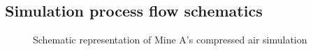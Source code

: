 \begin{appendices}
	\renewcommand{\thechapter}{\Roman{chapter}}	

\chapter{\hspace{0.3cm}Simulation process flow schematics}\label{Schematics}
\clearpage
	
	\begin{figure}[h!]
		\centering
		\caption{Schematic representation of Mine A's compressed air simulation}
		\label{fig: BEET Baseline model}
	\end{figure}
	\clearpage
	

\end{appendices}
